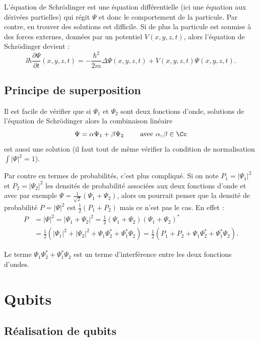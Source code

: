 \documentclass[11pt,class=report,crop=false]{standalone}
\begin{document}
L'équation de Schrödinger est une équation différentielle (ici une équation aux dérivées partielles) qui régit $\Psi$ et donc le comportement de la particule. Par contre, en trouver des solutions est difficile.
Si de plus la particule est soumise à des forces externes, données par un potentiel $V(x,y,z,t)$, alors l'équation de Schrödinger devient :
$$\ii \hbar \frac{\partial \Psi}{\partial t}(x,y,z,t) = - \frac{\hbar^2}{2m} \Delta \Psi(x,y,z,t) + V(x,y,z,t)\Psi(x,y,z,t).$$

\subsection{Principe de superposition}


Il est facile de vérifier que si $\Psi_1$ et $\Psi_2$ sont deux fonctions d'onde, solutions de l'équation de Schrödinger alors la combinaison linéaire 
$$\Psi = \alpha \Psi_1 + \beta \Psi_2 \qquad \text{ avec } \alpha, \beta \in \Cc$$ est aussi une solution (il faut tout de même vérifier la condition de normalisation $\int |\Psi|^2 = 1$).

Par contre en termes de probabilités, c'est plus compliqué. Si on note $P_1 = |\Psi_1|^2$ et $P_2 = |\Psi_2|^2$ les densités de probabilité associées aux deux fonctions d'onde et avec par exemple $\Psi = \frac{1}{\sqrt2} (\Psi_1+\Psi_2)$, 
alors on pourrait penser que la densité de probabilité $P = |\Psi|^2$ est $\frac12(P_1+P_2)$ mais ce n'est pas le cas. En effet :
\begin{align*}
P &= |\Psi|^2 = |\Psi_1+\Psi_2|^2 = \frac12(\Psi_1+\Psi_2)(\Psi_1+\Psi_2)^* \\
&= \frac12(|\Psi_1|^2+|\Psi_2|^2 + \Psi_1\Psi_2^* + \Psi_1^*\Psi_2)
= \frac12(P_1+P_2 + \Psi_1\Psi_2^* + \Psi_1^*\Psi_2).
\end{align*}

Le terme $\Psi_1\Psi_2^* + \Psi_1^*\Psi_2$ est un terme d'interférence entre les deux fonctions d'ondes.


\section{Qubits}

\subsection{Réalisation de qubits}
\end{document}
